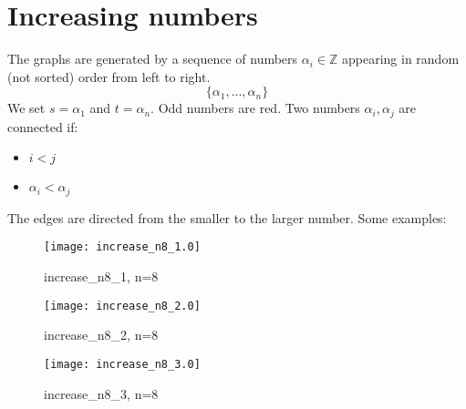 \documentclass{article}
\begin{document}
\section{Increasing numbers}
The graphs are generated by a sequence of numbers $\alpha_i\in\mathbb{Z}$ appearing in random (not sorted) order from left to right.
\[\{\alpha_1,...,\alpha_n\}\]
We set $s=\alpha_1$ and $t=\alpha_n$. Odd numbers are red.
Two numbers $\alpha_i,\alpha_j$ are connected if:
\begin{itemize}
\item $i<j$
\item $\alpha_i<\alpha_j$
\end{itemize}
The edges are directed from the smaller to the larger number.
Some examples:
\begin{figure}[h]
  \centering
\texttt{[image: increase\_n8\_1.0]}  
  \caption{increase_n8_1, n=8}
\end{figure}
\begin{figure}[h]
  \centering
\texttt{[image: increase\_n8\_2.0]}  
  \caption{increase_n8_2, n=8}
\end{figure}
\begin{figure}[h]
  \centering
  \texttt{[image: increase\_n8\_3.0]}
  \caption{increase_n8_3, n=8}
\end{figure}
\end{document}
